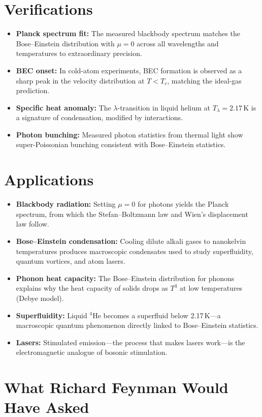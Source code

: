 \documentclass[11pt,openright]{book}
\begin{document}
\section*{Verifications}

\begin{itemize}
\item \textbf{Planck spectrum fit:} The measured blackbody spectrum matches the Bose--Einstein distribution with $\mu = 0$ across all wavelengths and temperatures to extraordinary precision.
\item \textbf{BEC onset:} In cold-atom experiments, BEC formation is observed as a sharp peak in the velocity distribution at $T < T_c$, matching the ideal-gas prediction.
\item \textbf{Specific heat anomaly:} The $\lambda$-transition in liquid helium at $T_\lambda = 2.17$\,K is a signature of condensation, modified by interactions.
\item \textbf{Photon bunching:} Measured photon statistics from thermal light show super-Poissonian bunching consistent with Bose--Einstein statistics.
\end{itemize}
\section*{Applications}

\begin{itemize}
\item \textbf{Blackbody radiation:} Setting $\mu = 0$ for photons yields the Planck spectrum, from which the Stefan--Boltzmann law and Wien's displacement law follow.
\item \textbf{Bose--Einstein condensation:} Cooling dilute alkali gases to nanokelvin temperatures produces macroscopic condensates used to study superfluidity, quantum vortices, and atom lasers.
\item \textbf{Phonon heat capacity:} The Bose--Einstein distribution for phonons explains why the heat capacity of solids drops as $T^3$ at low temperatures (Debye model).
\item \textbf{Superfluidity:} Liquid $^4$He becomes a superfluid below 2.17\,K---a macroscopic quantum phenomenon directly linked to Bose--Einstein statistics.
\item \textbf{Lasers:} Stimulated emission---the process that makes lasers work---is the electromagnetic analogue of bosonic stimulation.
\end{itemize}
\section*{What Richard Feynman Would Have Asked}
\end{document}
